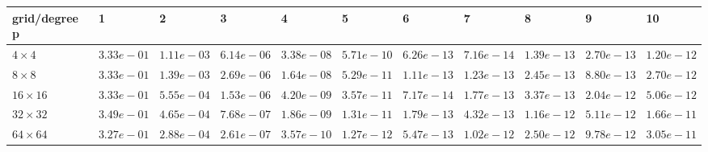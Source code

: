 \begin{tabular}{lllllllllll}
\hline
 grid/degree p   & 1          & 2          & 3          & 4          & 5          & 6          & 7          & 8          & 9          & 10         \\
\hline
 $4 \times 4$    & $3.33e-01$ & $1.11e-03$ & $6.14e-06$ & $3.38e-08$ & $5.71e-10$ & $6.26e-13$ & $7.16e-14$ & $1.39e-13$ & $2.70e-13$ & $1.20e-12$ \\
 $8 \times 8$    & $3.33e-01$ & $1.39e-03$ & $2.69e-06$ & $1.64e-08$ & $5.29e-11$ & $1.11e-13$ & $1.23e-13$ & $2.45e-13$ & $8.80e-13$ & $2.70e-12$ \\
 $16 \times 16$  & $3.33e-01$ & $5.55e-04$ & $1.53e-06$ & $4.20e-09$ & $3.57e-11$ & $7.17e-14$ & $1.77e-13$ & $3.37e-13$ & $2.04e-12$ & $5.06e-12$ \\
 $32 \times 32$  & $3.49e-01$ & $4.65e-04$ & $7.68e-07$ & $1.86e-09$ & $1.31e-11$ & $1.79e-13$ & $4.32e-13$ & $1.16e-12$ & $5.11e-12$ & $1.66e-11$ \\
 $64 \times 64$  & $3.27e-01$ & $2.88e-04$ & $2.61e-07$ & $3.57e-10$ & $1.27e-12$ & $5.47e-13$ & $1.02e-12$ & $2.50e-12$ & $9.78e-12$ & $3.05e-11$ \\
\hline
\end{tabular}